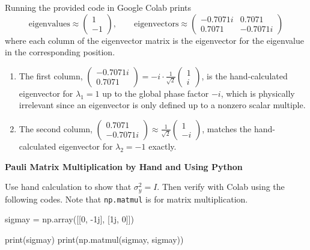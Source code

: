 \documentclass[a4paper, 10pt]{article}
\begin{document}
\begin{solution}
	Running the provided code in Google Colab prints
	\[
		\text{eigenvalues} \approx \begin{pmatrix}
			1 \\ -1
		\end{pmatrix}, \qquad
		\text{eigenvectors} \approx \begin{pmatrix}
			-0.7071i & 0.7071   \\
			0.7071   & -0.7071i
		\end{pmatrix}
	\]
	where each column of the eigenvector matrix is the eigenvector for the eigenvalue in the corresponding position.

	\begin{enumerate}
		\item  The first column, \( \begin{pmatrix} -0.7071i \\ 0.7071 \end{pmatrix} = -i \cdot \frac{1}{\sqrt{2}}\begin{pmatrix} 1 \\ i \end{pmatrix} \),
		      is the hand-calculated eigenvector for \( \lambda_1 = 1 \) up to the global phase factor \( -i \),
		      which is physically irrelevant since an eigenvector is only defined up to a nonzero scalar multiple.

		\item The second column, \( \begin{pmatrix} 0.7071 \\ -0.7071i \end{pmatrix} \approx \frac{1}{\sqrt{2}}\begin{pmatrix} 1 \\ -i \end{pmatrix} \),
		      matches the hand-calculated eigenvector for \( \lambda_2 = -1 \) exactly.
	\end{enumerate}
\end{solution}

\begin{problem}
\textbf{Pauli Matrix Multiplication by Hand and Using Python}
\par Use hand calculation to show that \( \sigma_y^2 = I \).
Then verify with Colab using the following codes.
Note that \texttt{np.matmul} is for matrix multiplication.
\begin{codingbox}
sigmay = np.array([[0, -1j], [1j, 0]])

print(sigmay)
print(np.matmul(sigmay, sigmay))
\end{codingbox}
\end{problem}
\end{document}
